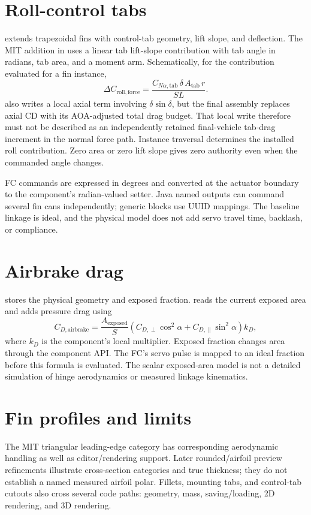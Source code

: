 \section{Roll-control tabs}
 extends trapezoidal fins with control-tab geometry, lift slope, and deflection. The MIT addition in  uses a linear tab lift-slope contribution with tab angle in radians, tab area, and a moment arm. Schematically, for the contribution evaluated for a fin instance,
\begin{equation}
 \Delta C_{\mathrm{roll,force}}=
 \frac{C_{N\alpha,\mathrm{tab}}\,\delta\,A_{\mathrm{tab}}\,r}{SL}.
\end{equation}
 also writes a local axial term involving \(\delta\sin\delta\), but the final  assembly replaces axial CD with its AOA-adjusted total drag budget. That local write therefore must not be described as an independently retained final-vehicle tab-drag increment in the normal force path. Instance traversal determines the installed roll contribution. Zero area or zero lift slope gives zero authority even when the commanded angle changes.

FC commands are expressed in degrees and converted at the actuator boundary to the component's radian-valued setter. Java named outputs can command several fin cans independently; generic blocks use UUID mappings. The baseline linkage is ideal, and the physical model does not add servo travel time, backlash, or compliance.

\section{Airbrake drag}
 stores the physical geometry and exposed fraction.  reads the current exposed area and adds pressure drag using
\begin{equation}
 C_{D,\mathrm{airbrake}}=
 \frac{A_{\mathrm{exposed}}}{S}
 \left(C_{D,\perp}\cos^2\alpha+C_{D,\parallel}\sin^2\alpha\right)k_D,
\end{equation}
where \(k_D\) is the component's local multiplier. Exposed fraction changes area through the component API. The FC's servo pulse is mapped to an ideal fraction before this formula is evaluated. The scalar exposed-area model is not a detailed simulation of hinge aerodynamics or measured linkage kinematics.

\section{Fin profiles and limits}
The MIT triangular leading-edge category has corresponding aerodynamic handling as well as editor/rendering support. Later rounded/airfoil preview refinements illustrate cross-section categories and true thickness; they do not establish a named measured airfoil polar. Fillets, mounting tabs, and control-tab cutouts also cross several code paths: geometry, mass, saving/loading, 2D rendering, and 3D rendering.


